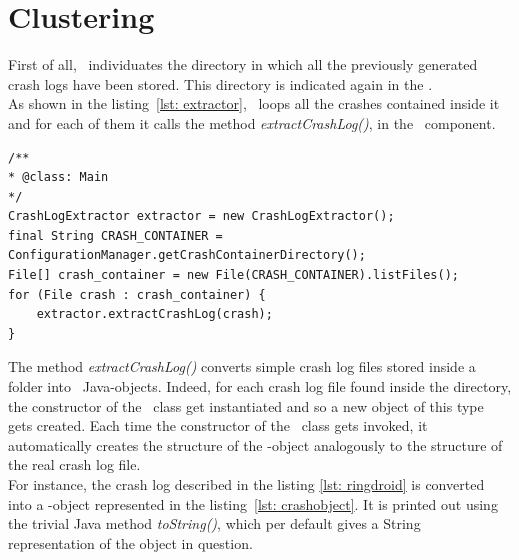 \section{Clustering}
\label{tool: clustering}


First of all, \toolname\ individuates the directory in which all the previously generated crash logs have been stored. This directory is indicated again in the \Config.\\  
As shown in the listing~\ref{lst: extractor}, \toolname\ loops all the crashes contained inside it and for each of them it calls the method \textit{extractCrashLog()}, in the \Extractor\ component. 

\begin{lstlisting}[caption=\Extractor\ code snippet converting crash files into CrashLog objects,label={lst: extractor}]
/**
* @class: Main
*/
CrashLogExtractor extractor = new CrashLogExtractor();
final String CRASH_CONTAINER = ConfigurationManager.getCrashContainerDirectory();
File[] crash_container = new File(CRASH_CONTAINER).listFiles();
for (File crash : crash_container) {
	extractor.extractCrashLog(crash);
}
\end{lstlisting} 
The method \textit{extractCrashLog()} converts simple crash log files stored inside a folder into \Crash\ Java-objects. 
Indeed, for each crash log file found inside the directory, the constructor of the \Crash\ class get instantiated and so a new object of this type gets created. Each time the constructor of the \Crash\ class gets invoked, it automatically creates the structure of the \Crash-object analogously to the structure of the real crash log file. \\
For instance, the crash log described in the listing \ref{lst: ringdroid} is converted into a \Crash-object represented in the listing~\ref{lst: crashobject}.
It is printed out using the trivial Java method \textit{toString()}, which  per default gives a String representation of the object in question.  

